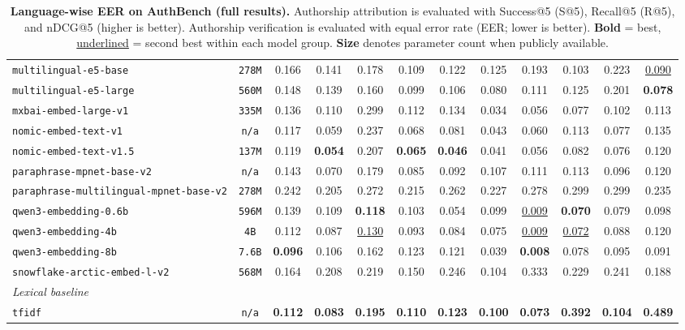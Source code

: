 \documentclass[11pt]{article}
\begin{document}
\begin{table}[htbp]
{\begin{tabular}{lccccccccccc}
\texttt{multilingual-e5-base} & \texttt{278M} & 0.166 & 0.141 & 0.178 & 0.109 & 0.122 & 0.125 & 0.193 & 0.103 & 0.223 & \underline{0.090} \\
\texttt{multilingual-e5-large} & \texttt{560M} & 0.148 & 0.139 & 0.160 & 0.099 & 0.106 & 0.080 & 0.111 & 0.125 & 0.201 & \textbf{0.078} \\
\texttt{mxbai-embed-large-v1} & \texttt{335M} & 0.136 & 0.110 & 0.299 & 0.112 & 0.134 & 0.034 & 0.056 & 0.077 & 0.102 & 0.113 \\
\texttt{nomic-embed-text-v1} & \texttt{n/a} & 0.117 & 0.059 & 0.237 & 0.068 & 0.081 & 0.043 & 0.060 & 0.113 & 0.077 & 0.135 \\
\texttt{nomic-embed-text-v1.5} & \texttt{137M} & 0.119 & \textbf{0.054} & 0.207 & \textbf{0.065} & \textbf{0.046} & 0.041 & 0.056 & 0.082 & 0.076 & 0.120 \\
\texttt{paraphrase-mpnet-base-v2} & \texttt{n/a} & 0.143 & 0.070 & 0.179 & 0.085 & 0.092 & 0.107 & 0.111 & 0.113 & 0.096 & 0.120 \\
\texttt{paraphrase-multilingual-mpnet-base-v2} & \texttt{278M} & 0.242 & 0.205 & 0.272 & 0.215 & 0.262 & 0.227 & 0.278 & 0.299 & 0.299 & 0.235 \\
\texttt{qwen3-embedding-0.6b} & \texttt{596M} & 0.139 & 0.109 & \textbf{0.118} & 0.103 & 0.054 & 0.099 & \underline{0.009} & \textbf{0.070} & 0.079 & 0.098 \\
\texttt{qwen3-embedding-4b} & \texttt{4B} & 0.112 & 0.087 & \underline{0.130} & 0.093 & 0.084 & 0.075 & \underline{0.009} & \underline{0.072} & 0.088 & 0.120 \\
\texttt{qwen3-embedding-8b} & \texttt{7.6B} & \textbf{0.096} & 0.106 & 0.162 & 0.123 & 0.121 & 0.039 & \textbf{0.008} & 0.078 & 0.095 & 0.091 \\
\texttt{snowflake-arctic-embed-l-v2} & \texttt{568M} & 0.164 & 0.208 & 0.219 & 0.150 & 0.246 & 0.104 & 0.333 & 0.229 & 0.241 & 0.188 \\
\midrule
\multicolumn{12}{l}{\textit{Lexical baseline}} \\
\midrule
\texttt{tfidf} & \texttt{n/a} & \textbf{0.112} & \textbf{0.083} & \textbf{0.195} & \textbf{0.110} & \textbf{0.123} & \textbf{0.100} & \textbf{0.073} & \textbf{0.392} & \textbf{0.104} & \textbf{0.489} \\
\bottomrule
\end{tabular}
}
\caption{\textbf{Language-wise EER on AuthBench (full results).} Authorship attribution is evaluated with Success@5 (S@5), Recall@5 (R@5), and nDCG@5 (higher is better). Authorship verification is evaluated with equal error rate (EER; lower is better). \textbf{Bold} = best, \underline{underlined} = second best within each model group. \textbf{Size} denotes parameter count when publicly available.}
\label{tab:lang-eer5-full}
\end{table}
\end{document}
